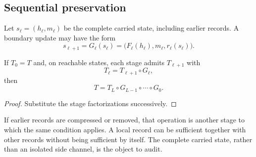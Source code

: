 \subsection{Sequential preservation}

Let \(s_\ell=(h_\ell,m_\ell)\) be the complete carried state, including earlier
records. A boundary update may have the form
\[
 s_{\ell+1}=G_\ell(s_\ell)
 =\bigl(F_\ell(h_\ell),m_\ell,r_\ell(s_\ell)\bigr).
\]
\begin{proposition}[Composition]
If \(T_0=T\) and, on reachable states, each stage admits \(T_{\ell+1}\) with
\[
 T_\ell=T_{\ell+1}\circ G_\ell,
\]
then
\[
 T=T_L\circ G_{L-1}\circ\cdots\circ G_0.
\]
\end{proposition}
\begin{proof}
Substitute the stage factorizations successively.
\end{proof}

If earlier records are compressed or removed, that operation is another stage
to which the same condition applies. A local record can be sufficient together
with other records without being sufficient by itself. The complete carried
state, rather than an isolated side channel, is the object to audit.
